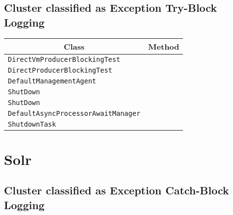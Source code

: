 \subsection{Cluster classified as Exception Try-Block Logging}

\begin{center}
\begin{tabular}{ll}\toprule
\multicolumn{1}{c}{Class}&\multicolumn{1}{c}{Method}\\\midrule
\lstinline/DirectVmProducerBlockingTest/&\raisebox{0pt}{\lstinline/run()/}\\
\lstinline/DirectProducerBlockingTest/&\raisebox{0pt}{\lstinline/run()/}\\
\lstinline/DefaultManagementAgent/&\raisebox{0pt}{\lstinline/run()/}\\
\lstinline/ShutDown/&\raisebox{0pt}{\lstinline/run()/}\\
\lstinline/ShutDown/&\raisebox{0pt}{\lstinline/run()/}\\
\lstinline/DefaultAsyncProcessorAwaitManager/&\raisebox{0pt}{\lstinline/interrupt(Exchange)/}\\
\lstinline/ShutdownTask/&\raisebox{0pt}{\lstinline/run()/}\\

\bottomrule
\end{tabular}
\end{center}

\section{Solr}\label{solr}

\subsection{Cluster classified as Exception Catch-Block Logging}

